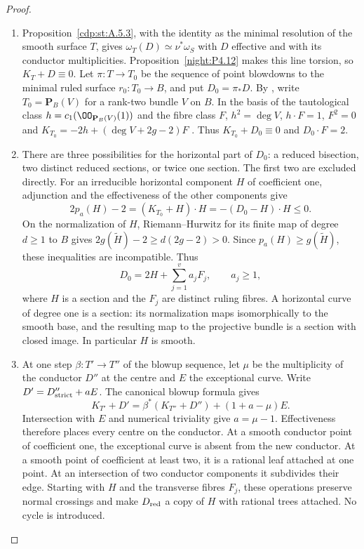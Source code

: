 \begin{proof}

\begin{enumerate}[label={$\langle1\rangle$\arabic*.},leftmargin=*]
\item Proposition~\ref{cdp:st:A.5.3}, with the identity as the
minimal resolution of the smooth surface $T$, gives
$\omega_T(D)\simeq\nu^*\omega_S$ with $D$ effective and with its
conductor multiplicities. Proposition~\ref{night:P4.12} makes this
line torsion, so $K_T+D\equiv0$.
Let $\pi:T\to T_0$ be the sequence of point blowdowns to the
minimal ruled surface $r_0:T_0\to B$, and put $D_0=\pi_*D$.
By \cite[III.10, p.~40]{Beauville1978}, write $T_0=\mathbf P_B(V)$
for a rank-two bundle $V$ on $B$. In the basis of the tautological
class $h=c_1(\OO_{\mathbf P_B(V)}(1))$ and the fibre class $F$,
$h^2=\deg V$, $h\cdot F=1$, $F^2=0$ and
$K_{T_0}=-2h+(\deg V+2g-2)F$
\cite[III.18, pp.~46--47]{Beauville1978}.
Thus $K_{T_0}+D_0\equiv0$ and $D_0\cdot F=2$.

\item There are three possibilities for the horizontal part of
$D_0$: a reduced bisection, two distinct reduced sections,
or twice one section. The first two are excluded directly.
For an irreducible horizontal component $H$ of coefficient
one, adjunction and the effectiveness of the other
components give
\[
 2p_a(H)-2=(K_{T_0}+H)\cdot H
       =-(D_0-H)\cdot H\le0.
\]
On the normalization of $H$, Riemann--Hurwitz for its
finite map of degree $d\ge1$ to $B$ gives
$2g(\widetilde H)-2\ge d(2g-2)>0$.
Since $p_a(H)\ge g(\widetilde H)$, these inequalities
are incompatible. Thus
\[
 D_0=2H+\sum_{j=1}^{v}a_jF_j,\qquad a_j\ge1,
\]
where $H$ is a section and the $F_j$ are distinct ruling
fibres. A horizontal curve of degree one is a section:
its normalization maps isomorphically to the smooth base,
and the resulting map to the projective bundle is a
section with closed image. In particular $H$ is smooth.

\item At one step $\beta:T'\to T''$ of the blowup sequence,
let $\mu$ be the multiplicity of the conductor $D''$ at the
centre and $E$ the exceptional curve.
Write $D'=D''_{\rm strict}+aE$. The canonical blowup formula
\cite[II.3(iv), pp.~17--18]{Beauville1978} gives
\[
 K_{T'}+D'
   =\beta^*(K_{T''}+D'')+(1+a-\mu)E.
\]
Intersection with $E$ and numerical triviality give
$a=\mu-1$. Effectiveness therefore places every centre
on the conductor. At a smooth conductor point of
coefficient one, the exceptional curve is absent from
the new conductor. At a smooth point of coefficient at
least two, it is a rational leaf attached at one point.
At an intersection of two conductor components it
subdivides their edge. Starting with $H$ and the
transverse fibres $F_j$, these operations preserve
normal crossings and make $D_{\rm red}$ a copy of $H$
with rational trees attached. No cycle is introduced.


\end{enumerate}
\end{proof}
